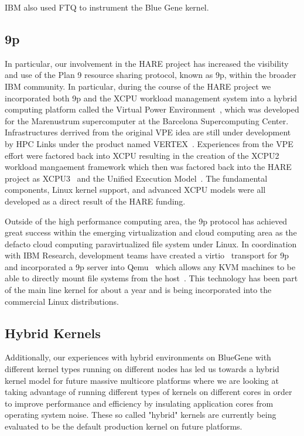 IBM also used FTQ to instrument the Blue Gene kernel\cite{bgpftq}.

\subsection{9p}

In particular, our involvement in the HARE project has increased the visibility and use
of the Plan 9 resource sharing protocol, known as 9p, within the broader IBM community.
In particular, during the course of the HARE project we incorporated both 9p and the XCPU
workload management system into a hybrid computing platform called the Virtual Power
Environment~\cite{VPE}, which was developed for the Marenustrum supercomputer at the Barcelona 
Supercomputing Center.  Infrastructures derrived from the original VPE idea are still
under development by HPC Links under the product named VERTEX~\cite{vertex}.
Experiences from the VPE effort were factored back into XCPU
resulting in the creation of the XCPU2~\cite{xcpu2} workload mangaement framework which then was
factored back into the HARE project as XCPU3~\cite{xcpu3} and the 
Unified Execution Model~\cite{uem}.  The fundamental components, Linux kernel support, and
advanced XCPU models were all developed as a direct result of the HARE funding.

Outside of the high performance computing area, the 9p protocol has achieved great success
within the emerging virtualization and cloud computing area as the defacto cloud computing
paravirtualized file system under Linux.  In coordination with IBM Research, development
teams have created a virtio~\cite{virtio} transport for 9p and incorporated a 9p server into
Qemu~\cite{qemu} which allows any KVM machines to be able to directly mount file systems
from the host~\cite{virtfs}.  This technology has been part of the main line kernel for about
a year and is being incorporated into the commercial Linux distributions.

\subsection{Hybrid Kernels}

Additionally, our experiences with hybrid environments on BlueGene with different kernel
types running on different nodes has led us towards a hybrid kernel model for future
massive multicore platforms where we are looking at taking advantage of running different
types of kernels on different cores in order to improve performance and efficiency by
insulating application cores from operating system noise.  These so called "hybrid" kernels
are currently being evaluated to be the default production kernel on future platforms.

